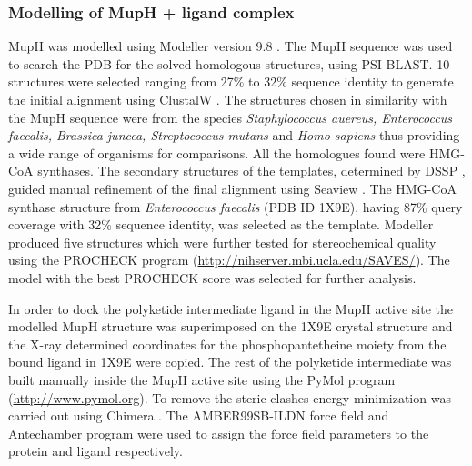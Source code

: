 			\subsubsection{Modelling of MupH + ligand complex}
			\label{sec:HomologyModellingMupH}
			MupH was modelled using Modeller version 9.8 \Parencite{Eswar2006}. The MupH sequence was used to search the PDB for the solved homologous structures, using PSI-BLAST. 10 structures were selected ranging from 27\% to 32\% sequence identity to generate the initial alignment using ClustalW \Parencite{Larkin2007}. The structures chosen in similarity with the MupH sequence were from the species \textit{Staphylococcus auereus, Enterococcus faecalis, Brassica juncea, Streptococcus mutans} and \textit{Homo sapiens} thus providing a wide range of organisms for comparisons. All the homologues found were HMG-CoA synthases. The secondary structures of the templates, determined by DSSP \Parencite{Joosten2011}, guided manual refinement of the final alignment using Seaview \Parencite{Galtier1996}. The HMG-CoA synthase structure from \textit{Enterococcus faecalis} (PDB ID 1X9E), having 87\% query coverage with 32\% sequence identity, was selected as the template. Modeller produced five structures which were further tested for stereochemical quality using the PROCHECK \Parencite{Laskowski1993} program (\url{http://nihserver.mbi.ucla.edu/SAVES/}). The model with the best PROCHECK score was selected for further analysis. 
			
			In order to dock the polyketide intermediate ligand in the MupH active site the modelled MupH structure was superimposed on the 1X9E crystal structure and the X-ray determined coordinates for the phosphopantetheine moiety from the bound ligand in 1X9E were copied. The rest of the polyketide intermediate was built manually inside the MupH active site using the PyMol program (\url{http://www.pymol.org}). To remove the steric clashes energy minimization was carried out using Chimera \Parencite{Pettersen2004}. The AMBER99SB-ILDN \Parencite{Hornak2006} force field and Antechamber program were used to assign the force field parameters to the protein and ligand respectively. 
			

